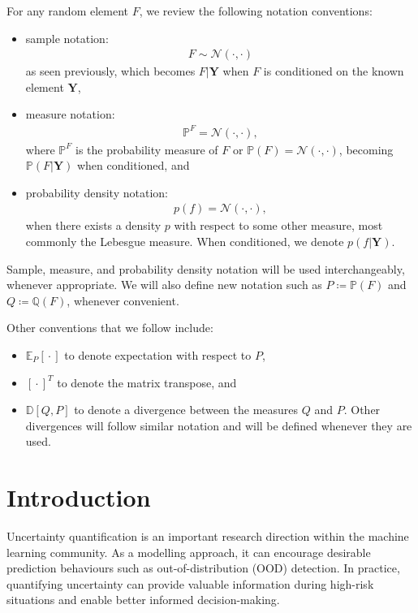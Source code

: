 \documentclass{article}
\newcommand{\wc}{\operatorname{{}\cdot{}}}
\numberwithin{equation}{section}
\begin{document}
For any random element $F$, we review the following notation conventions:
\begin{itemize}
    \setlength\itemsep{-0.25em}
    \item sample notation: 
        \begin{align}
            F \sim \mathcal{N}(\cdot, \cdot)
        \end{align}
        as seen previously, which becomes $F \vert \mathbf{Y}$ when $F$ is conditioned on the known element $\mathbf{Y}$,
    \item measure notation: 
        \begin{align}
            \mathbb{P}^F = \mathcal{N}(\cdot, \cdot),
        \end{align}
        where $\mathbb{P}^F$ is the probability measure of $F$ or $\mathbb{P}(F) = \mathcal{N}(\cdot, \cdot)$, becoming $\mathbb{P}(F \vert \mathbf{Y})$ when conditioned, and
    \item probability density notation: 
        \begin{align}
           p(f) = \mathcal{N}(\cdot, \cdot),
        \end{align}
        when there exists a density $p$ with respect to some other measure, most commonly the Lebesgue measure. 
        When conditioned, we denote $p(f\vert \mathbf{Y})$.
\end{itemize}
Sample, measure, and probability density notation will be used interchangeably, whenever appropriate. 
We will also define new notation such as $P \coloneqq \mathbb{P}(F)$ and $Q \coloneqq \mathbb{Q}(F)$, whenever convenient.

Other conventions that we follow include:
\begin{itemize}
    \setlength\itemsep{-0.25em}
    \item $\mathbb{E}_{P}[\wc]$ to denote expectation with respect to $P$,
    \item $\left[\wc\right]^T$ to denote the matrix transpose, and 
    \item $\mathbb{D}[Q, P]$ to denote a divergence between the measures $Q$ and $P$. Other divergences will follow similar notation and will be defined whenever they are used.
\end{itemize}
 

\newpage
\section{Introduction}
Uncertainty quantification is an important research direction within the machine learning community.
As a modelling approach, it can encourage desirable prediction behaviours such as out-of-distribution (OOD) detection. 
In practice, quantifying uncertainty can provide valuable information during high-risk situations and enable better informed decision-making.
\end{document}
